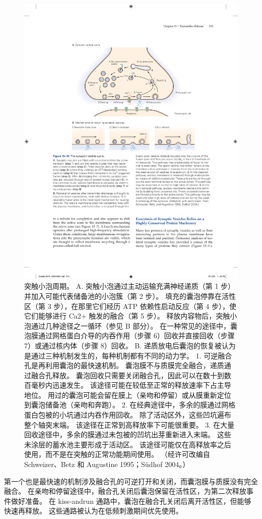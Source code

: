 \begin{figure}[htbp]
	\centering
	\includegraphics[width=0.7\linewidth]{chap15/fig_15_10}
	\caption{突触小泡周期。 A. 突触小泡通过主动运输充满神经递质（第 1 步）并加入可能代表储备池的小泡簇（第 2 步）。 填充的囊泡停靠在活性区（第 3 步），在那里它们经历 ATP 依赖性启动反应（第 4 步），使它们能够进行 Ca2+ 触发的融合（第 5 步）。 释放内容物后，突触小泡通过几种途径之一循环（参见 B 部分）。 在一种常见的途径中，囊泡膜通过网格蛋白介导的内吞作用（步骤 6）回收并直接回收（步骤 7）或通过核内体（步骤 8）回收。 B. 递质放电后囊泡的恢复被认为是通过三种机制发生的，每种机制都有不同的动力学。 1. 可逆融合孔是再利用囊泡的最快速机制。 囊泡膜不与质膜完全融合，递质通过融合孔释放。 囊泡回收只需要关闭融合孔，因此可以在数十到数百毫秒内迅速发生。 该途径可能在较低至正常的释放速率下占主导地位。 用过的囊泡可能会留在膜上（亲吻和停留）或从膜重新定位到囊泡储备池（亲吻和奔跑）。 2. 在经典途径中，多余的膜通过网格蛋白包被的小坑通过内吞作用回收。 除了活动区外，这些凹坑遍布整个轴突末端。 该途径在正常到高释放率下可能很重要。 3. 在大量回收途径中，多余的膜通过未包被的凹坑出芽重新进入末端。 这些未涂层的蓄水池主要形成于活动区。 该途径可能仅在高释放率之后使用，而不是在突触的正常功能期间使用。 （经许可改编自 Schweizer、Betz 和 Augustine 1995；Südhof 2004。）}
	\label{fig:15_10}
\end{figure}


第一个也是最快速的机制涉及融合孔的可逆打开和关闭，而囊泡膜与质膜没有完全融合。
在亲吻和停留途径中，融合孔关闭后囊泡保留在活性区，为第二次释放事件做好准备。
在 kiss-andrun 通路中，囊泡在融合孔关闭后离开活性区，但能够快速再释放。
这些通路被认为在低频刺激期间优先使用。


